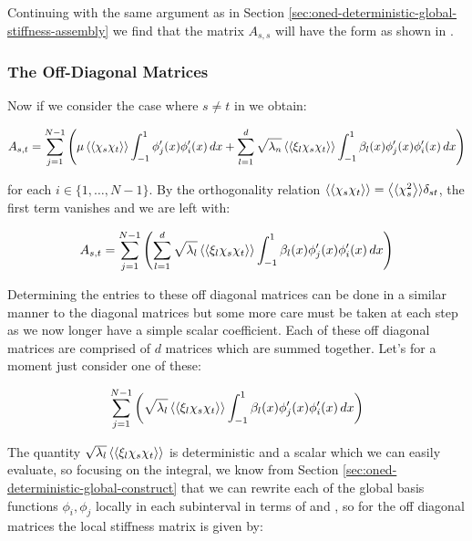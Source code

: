 Continuing with the same argument as in Section
\ref{sec:oned-deterministic-global-stiffness-assembly} we find that the matrix
$A_{s,s}$ will have the form as shown in
.

\subsubsection{The Off-Diagonal Matrices}

Now if we consider the case where $s \neq t$ in
 we obtain:

\begin{equation}\label{eq:oned-stochastic-off-diagonal-stiffness}
    A_{s,t} = \sum_{j=1}^{N - 1}\left(\mu\left\langle\langle\chi_s\chi_t\right\rangle\rangle
        \int_{-1}^1 \phi_j'(x)\phi_i'(x)\, dx
       + \sum_{l=1}^d\sqrt{\lambda_n}\left\langle\langle\xi_l\chi_s\chi_t\right\rangle\rangle
       \int_{-1}^1 \beta_l(x)\phi_j'(x)\phi_i'(x)\, dx\right)
\end{equation}

for each $i \in \{1,\ldots,N-1\}$. By the orthogonality relation
$\left\langle\langle\chi_s\chi_t\right\rangle\rangle = \left\langle\langle\chi_s^2\right\rangle\rangle\delta_{st}$, the first term vanishes
and we are left with:

\begin{equation}
    A_{s,t} = \sum_{j=1}^{N - 1}\left(
        \sum_{l=1}^d\sqrt{\lambda_l}\left\langle\langle\xi_l\chi_s\chi_t\right\rangle\rangle
            \int_{-1}^1\beta_l(x)\phi_j'(x)\phi_i'(x)\, dx\right)
\end{equation}

Determining the entries to these off diagonal matrices can be done in a similar
manner to the diagonal matrices but some more care must be taken at each step
as we now longer have a simple scalar coefficient. Each of these off diagonal
matrices are comprised of $d$ matrices which are summed together. Let's for a
moment just consider one of these:

\begin{equation}
    \sum_{j=1}^{N - 1}\left(\sqrt{\lambda_l}\left\langle\langle\xi_l\chi_s\chi_t\right\rangle\rangle
        \int_{-1}^1\beta_l(x)\phi_j'(x)\phi_i'(x)\, dx\right)
\end{equation}

The quantity $\sqrt{\lambda_l}\left\langle\langle\xi_l\chi_s\chi_t\right\rangle\rangle$ is deterministic and
a scalar which we can easily evaluate, so focusing on the integral, we know
from Section \ref{sec:oned-deterministic-global-construct} that we can rewrite
each of the global basis functions $\phi_i,\phi_j$ locally in each subinterval
in terms of  and
, so for the off diagonal matrices the local
stiffness matrix is given by:

